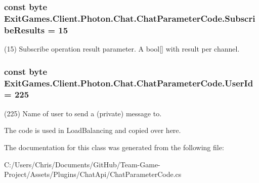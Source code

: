 \subsubsection[{\texorpdfstring{Subscribe\+Results}{SubscribeResults}}]{\setlength{\rightskip}{0pt plus 5cm}const byte Exit\+Games.\+Client.\+Photon.\+Chat.\+Chat\+Parameter\+Code.\+Subscribe\+Results = 15}\hypertarget{class_exit_games_1_1_client_1_1_photon_1_1_chat_1_1_chat_parameter_code_a4991d2c2c138a78d8c95be54d1c805da}{}\label{class_exit_games_1_1_client_1_1_photon_1_1_chat_1_1_chat_parameter_code_a4991d2c2c138a78d8c95be54d1c805da}


(15) Subscribe operation result parameter. A bool\mbox{[}\mbox{]} with result per channel.

\subsubsection[{\texorpdfstring{User\+Id}{UserId}}]{\setlength{\rightskip}{0pt plus 5cm}const byte Exit\+Games.\+Client.\+Photon.\+Chat.\+Chat\+Parameter\+Code.\+User\+Id = 225}\hypertarget{class_exit_games_1_1_client_1_1_photon_1_1_chat_1_1_chat_parameter_code_a4725b80416516202851fced3224ddf10}{}\label{class_exit_games_1_1_client_1_1_photon_1_1_chat_1_1_chat_parameter_code_a4725b80416516202851fced3224ddf10}


(225) Name of user to send a (private) message to.

The code is used in Load\+Balancing and copied over here.

The documentation for this class was generated from the following file\+:\begin{DoxyCompactItemize}
\item 
C\+:/\+Users/\+Chris/\+Documents/\+Git\+Hub/\+Team-\/\+Game-\/\+Project/\+Assets/\+Plugins/\+Chat\+Api/Chat\+Parameter\+Code.\+cs\end{DoxyCompactItemize}
